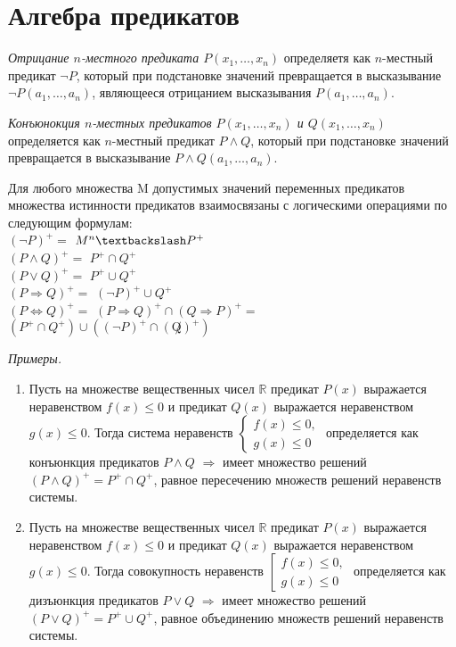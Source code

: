 \documentclass[otchet]{SCWorks}
\begin{document}
\section{Алгебра предикатов}
\par {\it Отрицание $n$-местного предиката $P(x_1, \dots, x_n)$} определяетя как $n$-местный предикат $\neg P$, который при подстановке значений превращается в высказывание $\neg P(a_1, \dots, a_n)$, являющееся отрицанием высказывания $P(a_1, \dots, a_n)$.
\par {\it Конъюнокция $n$-местных предикатов $P(x_1, \dots, x_n)$ и $Q(x_1, \dots, x_n)$} определяется как $n$-местный предикат $P \land Q$, который при подстановке значений превращается в высказывание $P\land Q(a_1, \dots, a_n)$.
\par Для любого множества M допустимых значений переменных предикатов множества истинности предикатов взаимосвязаны с логическими операциями по следующим формулам: \\
$(\neg P)^+ =$ $M^n \textbackslash P^+$ \\
$(P \land Q)^+ =$ $P^+ \cap Q^+$ \\
$(P \lor Q)^+ =$ $P^+ \cup Q^+$ \\
$(P \Rightarrow Q)^+ =$ $(\neg P)^+ \cup Q^+$ \\
$(P \Leftrightarrow Q)^+ =$ $(P \Rightarrow Q)^+ \cap (Q \Rightarrow P)^+ =$ $(P^+ \cap Q^+) \cup ((\neg P)^+ \cap (\not Q)^+)$
\par {\it Примеры.}
\begin{enumerate}
    \item Пусть на множестве вещественных чисел $\mathbb R$ предикат $P(x)$ выражается неравенством $f(x) \leq 0$ и предикат $Q(x)$ выражается неравенством $g(x) \leq 0$. Тогда система неравенств $\begin{cases} f(x) \leq 0, \\ g(x) \leq 0 \end{cases}$ определяется как конъюнкция предикатов $P \land Q$ $\Rightarrow$ имеет множество решений $(P \land Q)^+ = P^+ \cap Q^+$, равное пересечению множеств решений неравенств системы.
    \item Пусть на множестве вещественных чисел $\mathbb R$ предикат $P(x)$ выражается неравенством $f(x) \leq 0$ и предикат $Q(x)$ выражается неравенством $g(x) \leq 0$. Тогда совокупность неравенств $\left[ \begin{gathered} f(x) \leq 0, \\ g(x) \leq 0 \end{gathered} \right.$ определяется как дизъюнкция предикатов $P \lor Q$ $\Rightarrow$ имеет множество решений $(P \lor Q)^+ = P^+ \cup Q^+$, равное объединению множеств решений неравенств системы.
\end{enumerate}
\end{document}
